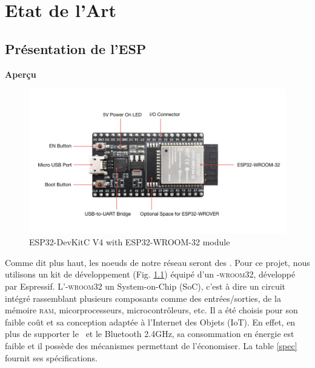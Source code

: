 \chapter{Etat de l'Art}

\section{Présentation de l'ESP}
    \textbf{Aperçu}

    \begin{figure}[H]
        \centering
        \includegraphics[scale=0.3]{images/esp32-devkitc.jpg}
        \caption{ESP32-DevKitC V4 with ESP32-WROOM-32 module
            \cite{esp32-gettingStarted_w}}
        \label{esp32_img}
    \end{figure}
    Comme dit plus haut, les noeuds de notre réseau seront des \esp.
    Pour ce projet, nous utilisons un kit de développement (Fig. \ref{esp32_img}) équipé d'un
    \esp\textsc{-wroom32}, développé par Espressif. L'\esp\textsc{-wroom32}
    un System-on-Chip (SoC), c'est à dire un circuit intégré rassemblant plusieurs
    composants comme des entrées/sorties, de la mémoire \textsc{ram}, micorprocesseurs,
    microcontrôleurs, etc.
    Il a été choisis pour son faible coût et sa conception adaptée à l'Internet des Objets (IoT). 
    En effet, en plus de supporter le \wifi\ et le Bluetooth 2.4GHz,
    sa consommation en énergie est faible et il possède des mécanismes permettant de l'économiser. %
    La table \ref{spec} fournit ses spécifications.
